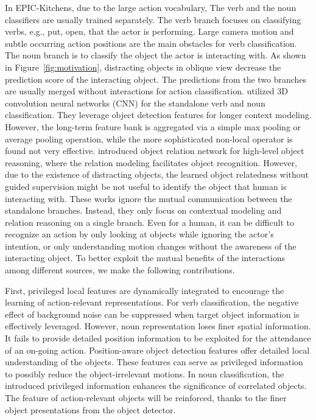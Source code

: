 \documentclass[letterpaper]{article} \usepackage{aaai20}  \usepackage{times}  \usepackage{helvet} \usepackage{courier}  \usepackage[hyphens]{url}  \usepackage{graphicx} \urlstyle{rm} \def\UrlFont{\rm}  \usepackage{graphicx}  \frenchspacing  \setlength{\pdfpagewidth}{8.5in}  \setlength{\pdfpageheight}{11in}  \usepackage{amsfonts,amssymb}
\begin{document}
In EPIC-Kitchens, due to the large action vocabulary, 
The verb and the noun classifiers are usually trained separately. The verb branch focuses on classifying verbs, e.g., put, open, that the actor is performing. Large camera motion and subtle occurring action positions are the main obstacles for verb classification. The noun branch is to classify the object the actor is interacting with. As shown in Figure~\ref{fig:motivation}, distracting objects in oblique view decrease the prediction score of the interacting object.
The predictions from the two branches are usually merged without interactions for action classification. 
\cite{Wu2018LongTermFB} utilized 3D convolution neural networks (CNN) for the standalone verb and noun classification.
They leverage object detection features for longer context modeling. However, the long-term feature bank is aggregated via a simple max pooling or average pooling operation, while the more sophisticated non-local operator is found not very effective.
\cite{Baradel2018ObjectLV} introduced object relation network for high-level object reasoning, where the relation modeling facilitates object recognition. However, due to the existence of distracting objects, the learned object relatedness without guided supervision might be not useful to identify the object that human is interacting with.
These works ignore the mutual communication between the standalone branches.
Instead, they only focus on contextual modeling and relation reasoning on a single branch.
Even for a human, it can be difficult to recognize an action by only looking at objects while ignoring the actor's intention, or only understanding motion changes without the awareness of the interacting object. To better exploit the mutual benefits of the interactions among different sources, we make the following contributions.

First, privileged local features are dynamically integrated to encourage the learning of action-relevant representations. 
For verb classification, the negative effect of background noise can be suppressed when target object information is effectively leveraged.
However, noun representation loses finer spatial information. It fails to provide detailed position information to be exploited for the attendance of an on-going action.
Position-aware object detection features offer detailed local understanding of the objects. These features can serve as privileged information to possibly reduce the object-irrelevant motions.
In noun classification, the introduced privileged information enhances the significance of correlated objects. The feature of action-relevant objects will be reinforced, thanks to the finer object presentations from the object detector.
\end{document}
